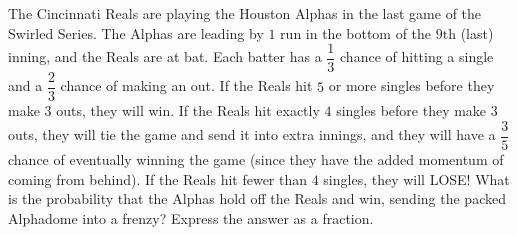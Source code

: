 The Cincinnati Reals are playing the Houston Alphas in the last game of the Swirled Series.  The Alphas are leading by $1$ run in the bottom of the $9\text{th}$ (last) inning, and the Reals are at bat.  Each batter has a $\dfrac{1}{3}$ chance of hitting a single and a $\dfrac{2}{3}$ chance of making an out.  If the Reals hit $5$ or more singles before they make $3$ outs, they will win.  If the Reals hit exactly $4$ singles before they make $3$ outs, they will tie the game and send it into extra innings, and they will have a $\dfrac{3}{5}$ chance of eventually winning the game (since they have the added momentum of coming from behind).  If the Reals hit fewer than $4$ singles, they will LOSE!  What is the probability that the Alphas hold off the Reals and win, sending the packed Alphadome into a frenzy?  Express the answer as a fraction.